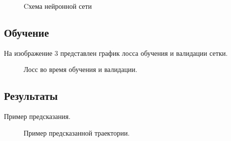 \documentclass[12pt, twoside]{article}
\begin{document}
\begin{figure}[!h]
\caption{Cхема нейронной сети}
\label{fig:image}
\end{figure}


\subsection{Обучение}

На изображение $3$ представлен график лосса обучения и валидации сетки.


\begin{figure}[!h]
\caption{Лосс во время обучения и валидации.}
\label{fig:image}
\end{figure}



\subsection{Результаты}

Пример предсказания.


\begin{figure}[!h]
\caption{Пример предсказанной траектории.}
\label{fig:image}
\end{figure}
\newpage


\end{document}
